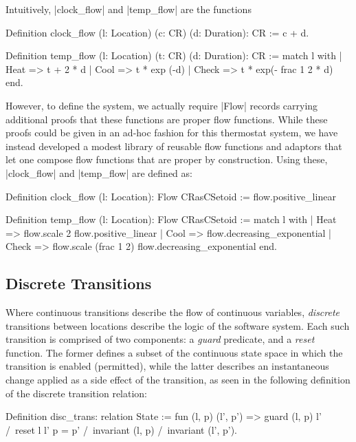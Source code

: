 \documentclass[runningheads]{llncs}
\begin{document}
Intuitively, |clock_flow| and |temp_flow| are the functions
\begin{code}
Definition clock_flow (l: Location) (c: CR) (d: Duration): CR :=
  c + d.

Definition temp_flow (l: Location) (t: CR) (d: Duration): CR :=
  match l with
  | Heat => t + 2 * d
  | Cool => t * exp (-d)
  | Check => t * exp(- frac 1 2 * d)
  end.
\end{code}
However, to define the system, we actually require |Flow| records carrying additional proofs that these functions are proper flow functions. While these proofs could be given in an ad-hoc fashion for this thermostat system, we have instead developed a modest library of reusable flow functions and adaptors that let one compose flow functions that are proper by construction. Using these, |clock_flow| and |temp_flow| are defined as:
\begin{code}
Definition clock_flow (l: Location): Flow CRasCSetoid :=
  flow.positive_linear

Definition temp_flow (l: Location): Flow CRasCSetoid :=
  match l with
  | Heat => flow.scale 2 flow.positive_linear
  | Cool => flow.decreasing_exponential
  | Check => flow.scale (frac 1 2) flow.decreasing_exponential
  end.
\end{code}

\subsection{Discrete Transitions}
\label{conc.disc_trans}

Where continuous transitions describe the flow of continuous variables, \emph{discrete} transitions between locations describe the logic of the software system. Each such transition is comprised of two components: a \emph{guard} predicate, and a \emph{reset} function. The former defines a subset of the continuous state space in which the transition is enabled (permitted), while the latter describes an instantaneous change applied as a side effect of the transition, as seen in the following definition of the discrete transition relation:

\begin{code}
  Definition disc_trans: relation State := fun (l, p) (l', p') =>
    guard (l, p) l' /\ reset l l' p = p' /\
    invariant (l, p) /\ invariant (l', p').
\end{code}

\end{document}
